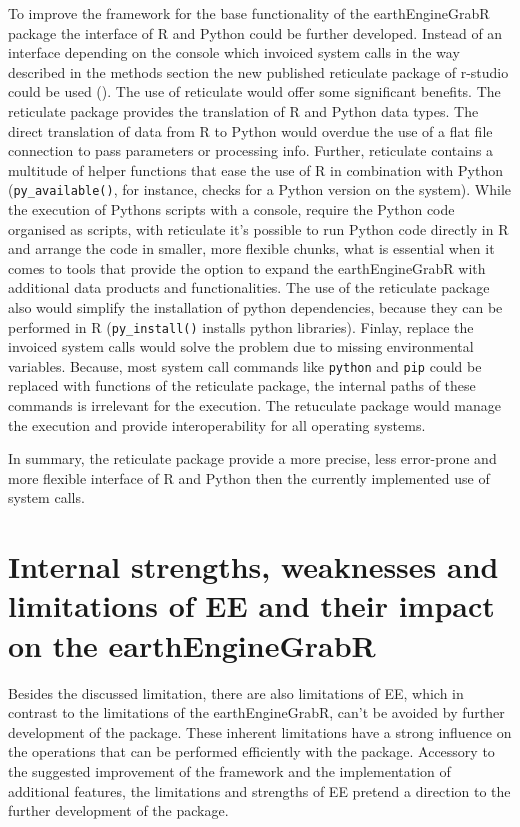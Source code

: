 To improve the framework for the base functionality of the earthEngineGrabR package the interface of R and Python could be further developed. Instead of an interface depending on the console which invoiced system calls in the way described in the methods section the new published reticulate package of r-studio could be used (\cite{reticulate}). The use of reticulate would offer some significant benefits. The reticulate package provides the translation of R and Python data types. The direct translation of data from R to Python would overdue the use of a flat file connection to pass parameters or processing info. Further, reticulate contains a multitude of helper functions that ease the use of R in combination with Python (\texttt{py\_available()}, for instance, checks for a Python version on the system). While the execution of Pythons scripts with a console, require the Python code organised as scripts, with reticulate it's possible to run Python code directly in R and arrange the code in smaller, more flexible chunks, what is essential when it comes to tools that provide the option to expand the earthEngineGrabR with additional data products and functionalities. The use of the reticulate package also would simplify the installation of python dependencies, because they can be performed in R (\texttt{py\_install()} installs python libraries). Finlay, replace the invoiced system calls would solve the problem due to missing environmental variables. Because, most system call commands like \texttt{python} and \texttt{pip} could be replaced with functions of the reticulate package, the internal paths of these commands is irrelevant for the execution. The retuculate package would manage the execution and provide interoperability for all operating systems.

In summary, the reticulate package provide a more precise, less error-prone and more flexible interface of R and Python then the currently implemented use of system calls.

\section{Internal strengths, weaknesses and limitations of EE and their impact on the earthEngineGrabR}

Besides the discussed limitation, there are also limitations of EE, which in contrast to the limitations of the earthEngineGrabR, can't be avoided by further development of the package. 
These inherent limitations have a strong influence on the operations that can be performed efficiently with the package.
Accessory to the suggested improvement of the framework and the
implementation of additional features, the limitations and strengths of EE pretend a direction to the further development of the package.


